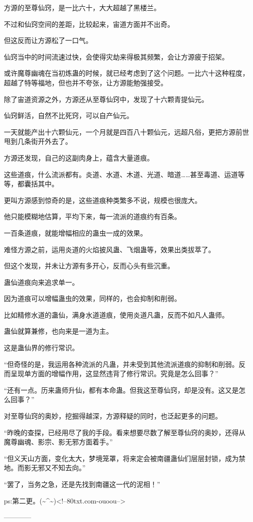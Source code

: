 \begin{this_body}
方源的至尊仙窍，是一比六十，大大超越了黑楼兰。

不过和仙窍空间的差距，比较起来，宙道方面并不出奇。

但这反而让方源松了一口气。

仙窍当中的时间流速过快，会使得灾劫来得极其频繁，会让方源疲于招架。

或许魔尊幽魂在当初炼蛊的时候，就已经考虑到了这个问题。一比六十这种程度，超越了特等福地，但也并不夸张，让方源能勉强接受。

除了宙道资源之外，方源还从至尊仙窍中，发现了十六颗青提仙元。

仙窍鲜活，自然不比死窍，可以自产仙元。

一天就能产出十六颗仙元，一个月就是四百八十颗仙元，远超凡俗，更把方源前世甩到几条街开外去了。

方源还发现，自己的这副肉身上，蕴含大量道痕。

这些道痕，什么流派都有。炎道、水道、木道、光道、暗道……甚至毒道、运道等等，都囊括其中。

更叫方源感到惊奇的是，这些道痕种类繁多不说，规模也很庞大。

他只能模糊地估算，平均下来，每一流派的道痕约有百条。

一百条道痕，就能增幅相应的蛊虫一成的效果。

难怪方源之前，运用炎道的火焰披风蛊、飞烟蛊等，效果出类拔萃了。

但这个发现，并未让方源有多开心，反而心头有些沉重。

蛊仙道痕向来追求单一。

因为道痕可以增幅蛊虫的效果，同样的，也会抑制和削弱。

比如精修水道的蛊仙，满身水道道痕，使用炎道凡蛊，反而不如凡人蛊师。

蛊仙就算兼修，也向来是一道为主。

这是蛊仙界的修行常识。

“但奇怪的是，我运用各种流派的凡蛊，并未受到其他流派道痕的抑制和削弱。反而呈现单方面的增幅作用，这显然违背了修行常识。究竟是怎么回事？”

“还有一点。历来蛊师升仙，都有本命蛊。但我这至尊仙窍，却是没有。这又是怎么回事？”

对至尊仙窍的奥妙，挖掘得越深，方源释疑的同时，也泛起更多的问题。

“昨晚的查探，已经用尽了我的手段。看来想要尽数了解至尊仙窍的奥妙，还得从魔尊幽魂、影宗、影无邪方面着手。”

“但义天山方面，变化太大，梦境笼罩，将来定会被南疆蛊仙们层层封锁，成为禁地。而影无邪又不知去向。”

“罢了，当务之急，还是先找到南疆这一代的泥相！”

ps:第二更。(\~{}\^{}\~{})<!--80txt.com-ouoou-->

------------

\end{this_body}

